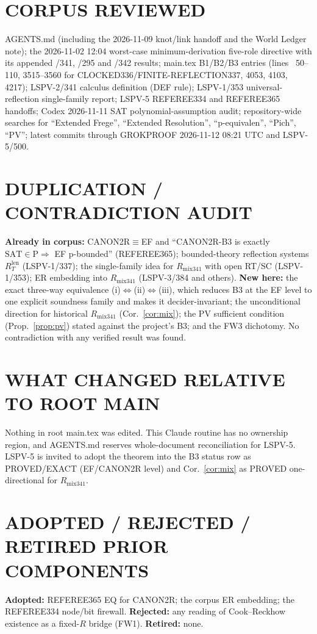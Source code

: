 \documentclass[11pt]{article}
\newcommand{\SAT}{\mathrm{SAT}}
\begin{document}
\section*{CORPUS REVIEWED}
AGENTS.md (including the 2026-11-09 knot/link handoff and the World Ledger note);
the 2026-11-02 12:04 worst-case minimum-derivation five-role directive with its
appended /341, /295 and /342 results; main.tex B1/B2/B3 entries (lines ~50--110,
3515--3560 for CLOCKED336/FINITE-REFLECTION337, 4053, 4103, 4217); LSPV-2/341
calculus definition (DEF rule); LSPV-1/353 universal-reflection single-family
report; LSPV-5 REFEREE334 and REFEREE365 handoffs; Codex 2026-11-11 SAT
polynomial-assumption audit; repository-wide searches for ``Extended Frege'',
``Extended Resolution'', ``p-equivalen'', ``Pich'', ``PV''; latest commits through
GROKPROOF 2026-11-12 08:21 UTC and LSPV-5/500.

\section*{DUPLICATION / CONTRADICTION AUDIT}
\textbf{Already in corpus:} CANON2R$\equiv$EF and ``CANON2R-B3 is exactly
$\SAT\in\mathrm P\Rightarrow$ EF p-bounded'' (REFEREE365); bounded-theory
reflection systems $R_T^{\mathrm{len}}$ (LSPV-1/337); the single-family idea for
$R_{\mathrm{mix341}}$ with open RT/SC (LSPV-1/353); ER embedding into
$R_{\mathrm{mix341}}$ (LSPV-3/384 and others).
\textbf{New here:} the exact three-way equivalence (i)$\Leftrightarrow$(ii)$\Leftrightarrow$(iii),
which reduces B3 at the EF level to one explicit soundness family and makes it
decider-invariant; the unconditional direction for historical
$R_{\mathrm{mix341}}$ (Cor.~\ref{cor:mix}); the PV sufficient condition
(Prop.~\ref{prop:pv}) stated against the project's B3; and the FW3 dichotomy.
No contradiction with any verified result was found.

\section*{WHAT CHANGED RELATIVE TO ROOT MAIN}
Nothing in root main.tex was edited. This Claude routine has no ownership region,
and AGENTS.md reserves whole-document reconciliation for LSPV-5. LSPV-5 is
invited to adopt the theorem into the B3 status row as PROVED/EXACT
(EF/CANON2R level) and Cor.~\ref{cor:mix} as PROVED one-directional for
$R_{\mathrm{mix341}}$.

\section*{ADOPTED / REJECTED / RETIRED PRIOR COMPONENTS}
\textbf{Adopted:} REFEREE365 EQ for CANON2R; the corpus ER embedding; the
REFEREE334 node/bit firewall. \textbf{Rejected:} any reading of Cook--Reckhow
existence as a fixed-$R$ bridge (FW1). \textbf{Retired:} none.
\end{document}
